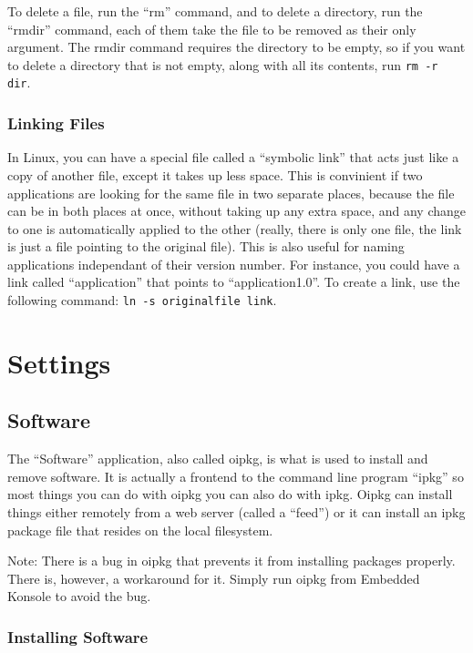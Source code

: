 \documentclass[12pt,letterpaper,oneside, openany]{book} \usepackage[latin1] {inputenc}
\begin{document}
To delete a file, run the ``rm'' command, and to delete a directory, run the ``rmdir'' command, each of them take the file to be removed as their only argument.  The rmdir command requires the directory to be empty, so if you want to delete a directory that is not empty, along with all its contents, run \verb+rm -r dir+.

\section{Linking Files}

In Linux, you can have a special file called a ``symbolic link'' that acts just like a copy of another file, except it takes up less space.  This is convinient if two applications are looking for the same file in two separate places, because the file can be in both places at once, without taking up any extra space, and any change to one is automatically applied to the other (really, there is only one file, the link is just a file pointing to the original file).  This is also useful for naming applications independant of their version number.  For instance, you could have a link called ``application'' that points to ``application1.0''.  To create a link, use the following command: \verb+ln -s originalfile link+.

\part{Settings}
\chapter{Software}

The ``Software'' application, also called oipkg, is what is used to install and remove software.  It is actually a frontend to the command line program ``ipkg'' so most things you can do with oipkg you can also do with ipkg.  Oipkg can install things either remotely from a web server (called a ``feed'') or it can install an ipkg package file that resides on the local filesystem.

Note: There is a bug in oipkg that prevents it from installing packages properly.  There is, however, a workaround for it.  Simply run oipkg from Embedded Konsole to avoid the bug.

\section{Installing Software}
\end{document}

